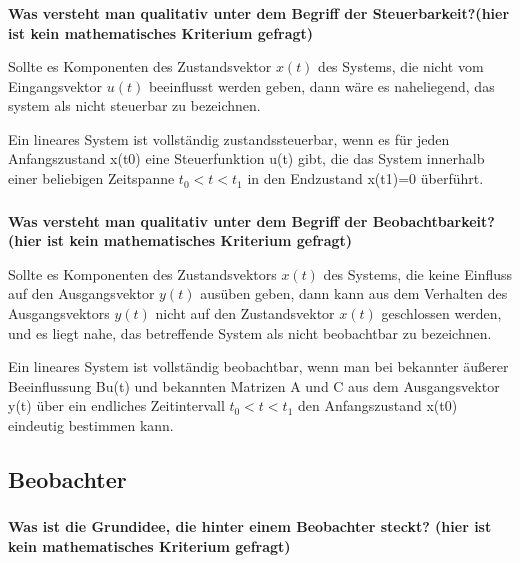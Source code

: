 \subsubsection{}
\textbf{Was versteht man qualitativ unter dem Begriff der Steuerbarkeit?(hier ist kein mathematisches Kriterium gefragt)}

Sollte es Komponenten des Zustandsvektor $x(t)$ des Systems, die nicht vom Eingangsvektor $u(t)$ beeinflusst werden geben, dann wäre es naheliegend, das system als nicht steuerbar zu bezeichnen.

Ein lineares System ist vollständig zustandssteuerbar, wenn es für jeden Anfangszustand x(t0) eine Steuerfunktion u(t) gibt, die das System innerhalb einer beliebigen Zeitspanne $t_0 < t < t_1$ in den Endzustand x(t1)=0 überführt.

\subsubsection{}
\textbf{Was versteht man qualitativ unter dem Begriff der Beobachtbarkeit?(hier ist kein mathematisches Kriterium gefragt)}

Sollte es Komponenten des Zustandsvektors $x(t)$ des Systems, die keine Einfluss auf den Ausgangsvektor $y(t)$ ausüben geben, dann kann aus dem Verhalten des Ausgangsvektors $y(t)$ nicht auf den Zustandsvektor $x(t)$ geschlossen werden, und es liegt nahe, das betreffende System als nicht beobachtbar zu bezeichnen.

Ein lineares System ist vollständig beobachtbar, wenn man bei bekannter äußerer Beeinflussung Bu(t) und bekannten Matrizen A und C aus dem Ausgangsvektor y(t) über ein endliches Zeitintervall $t_0 < t < t_1$ den Anfangszustand x(t0) eindeutig bestimmen kann.

\subsection{Beobachter}
\subsubsection{}
\textbf{Was ist die Grundidee, die hinter einem Beobachter steckt? (hier ist kein mathematisches Kriterium gefragt)}

